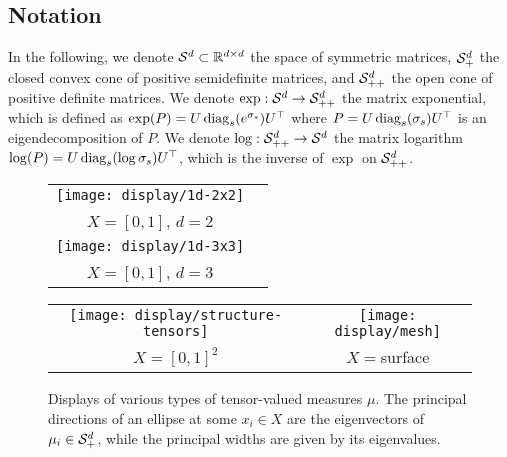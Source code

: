 % 


\subsection{Notation}

In the following, we denote $\mathcal{S}^d \subset \mathbb{R}^{d \times d}$ the space of symmetric matrices, $\mathcal{S}_+^d$ the closed convex cone of positive semidefinite matrices, and $\mathcal{S}_{++}^d$ the open cone of positive definite matrices. 
%
We denote $\exp: \mathcal{S}^d \to \mathcal{S}_{++}^d$ the matrix exponential, which is defined as $\exp(P)=U \operatorname{diag}_s(e^{\sigma_s})U^\top$ where $P=U \operatorname{diag}_s(\sigma_s) U^\top$ is an eigendecomposition of $P$.
We denote $\log: \mathcal{S}_{++}^d \to \mathcal{S}^d$ the matrix logarithm $\log(P)=U \operatorname{diag}_s(\log \sigma_s)U^\top$, which is the inverse of $\exp$ on $\mathcal{S}_{++}^d$. %


\begin{figure}\centering
\begin{minipage}[c]{.48\linewidth}
\begin{tabular}{@{}c@{}c@{}}
{\texttt{[image: display/1d-2x2]}}\\
$X=[0,1]$, $d=2$ \\[2mm]
{\texttt{[image: display/1d-3x3]}} \\
$X=[0,1]$, $d=3$
\end{tabular}
\end{minipage} 
\begin{minipage}[c]{.49\linewidth}
\begin{tabular}{@{}c@{}c@{}}
\texttt{[image: display/structure-tensors]}&
\texttt{[image: display/mesh]}\\
 $X=[0,1]^2$ & $X=$surface \\
\end{tabular}
   \end{minipage}
\caption{Displays of various types of tensor-valued measures $\mu$. The principal directions of an ellipse at some $x_i \in X$ are the eigenvectors of $\mu_i \in \mathcal{S}_+^d$, while the principal widths are given by its eigenvalues. 
} \label{fig:display}
\end{figure}


